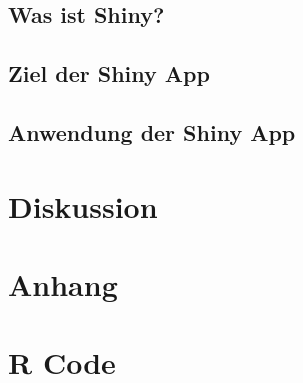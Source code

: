 \documentclass[12pt]{article}\usepackage[]{graphicx}\usepackage[]{color}
\numberwithin{equation}{section}
\begin{document}
\subsection{Was ist Shiny?}
\subsection{Ziel der Shiny App}
\subsection{Anwendung der Shiny App}

\section{Diskussion}
\newpage



\section{Anhang}
\appendix
\section{R Code}
\end{document}

